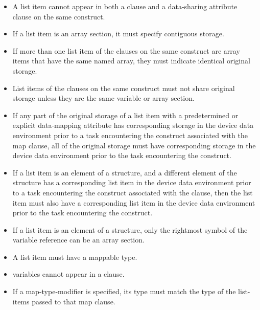 \restrictions
\begin{itemize}

\item A list item cannot appear in both a  clause and a data-sharing attribute clause on the same construct.

\item If a list item is an array section, it must specify contiguous storage.

\item If more than one list item of the  clauses on the same construct
are array items that have the same named array, they must indicate
identical original storage.

\item List items of the  clauses on the same construct must not share
original storage unless they are the same variable or array section.

\item If any part of the original storage of a list item with a predetermined or
explicit data-mapping attribute has corresponding storage in the device data
environment prior to a task encountering the construct associated with the map
clause, all of the original storage must have corresponding storage
in the device data environment prior to the task encountering the construct.

\item If a list item is an element of a structure, and a different element
of the structure has a corresponding list item in the device data environment
prior to a task encountering the construct associated with the 
clause, then the list item must also have a corresponding list item in the
device data environment prior to the task encountering the construct.

\item If a list item is an element of a structure, only the rightmost symbol of the variable reference can be an array section.

\item A list item must have a mappable type.

\item {} variables cannot appear in a  clause.

\item If a  map-type-modifier is specified, its type must match the type of the list-items passed to that map clause.


\end{itemize}
